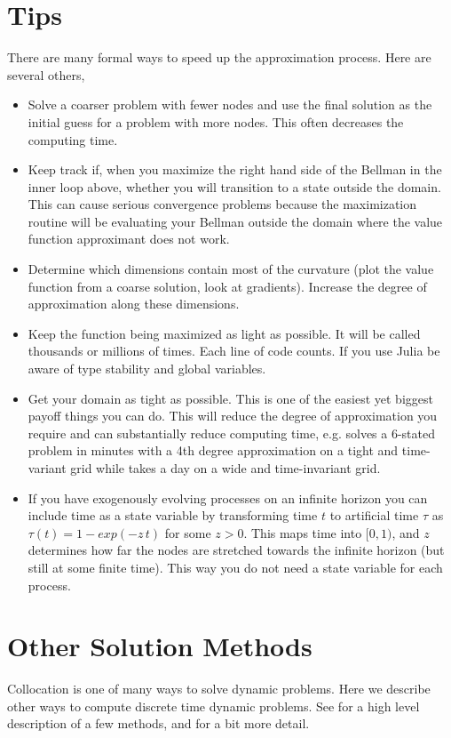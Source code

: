 \documentclass[11pt]{article}%
\begin{document}
\section{Tips}
There are many formal ways to speed up the approximation process. Here are several others,
\begin{itemize}
	\item Solve a coarser problem with fewer nodes and use the final solution as the initial guess for a problem with more nodes. This often decreases the computing time.
	\item Keep track if, when you maximize the right hand side of the Bellman in the inner loop above, whether you will transition to a state outside the domain. This can cause serious convergence problems because the maximization routine will be evaluating your Bellman outside the domain where the value function approximant does not work.
	\item Determine which dimensions contain most of the curvature (plot the value function from a coarse solution, look at gradients). Increase the degree of approximation along these dimensions.
	\item Keep the function being maximized as light as possible. It will be called thousands or millions of times. Each line of code counts. If you use Julia be aware of type stability and global variables.
	\item Get your domain as tight as possible. This is one of the easiest yet biggest payoff things you can do. This will reduce the degree of approximation you require and can substantially reduce computing time, e.g. \citet{Cai2015social} solves a 6-stated problem in minutes with a 4th degree approximation on a tight and time-variant grid while \citet{lemoinetraeger} takes a day on a wide and time-invariant grid.
	\item If you have exogenously evolving processes on an infinite horizon you can include time as a state variable by transforming time $t$ to artificial time $\tau$ as $\tau(t) = 1- exp(-z\,t)$ for some $z > 0$. This maps time into $[0,1)$, and $z$ determines how far the nodes are stretched towards the infinite horizon (but still at some finite time). This way you do not need a state variable for each process.
\end{itemize}

\section{Other Solution Methods}
Collocation is one of many ways to solve dynamic problems. Here we describe other ways to compute discrete time dynamic problems. See \citet{Fernandez-Villaverde2016} for a high level description of a few methods, and \citet{Judd1998} for a bit more detail.
\end{document}
